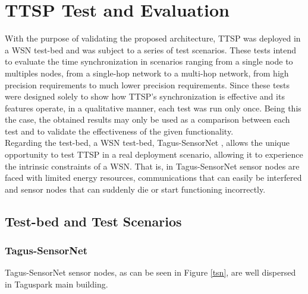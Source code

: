 \chapter{TTSP Test and Evaluation}

With the purpose of validating the proposed architecture, TTSP was deployed in a WSN test-bed and was subject to a series of test scenarios. These tests intend to evaluate the time synchronization in scenarios ranging from a single node to multiples nodes, from a single-hop network to a multi-hop network, from high precision requirements to much lower precision requirements. Since these tests were designed solely to show how TTSP's synchronization is effective and its features operate, in a qualitative manner, each test was run only once. Being this the case, the obtained results may only be used as a comparison between each test and to validate the effectiveness of the given functionality.\\
Regarding the test-bed, a WSN test-bed, Tagus-SensorNet \cite{conf/icccn/PedrosaMRN08}, allows the unique opportunity to test TTSP in a real deployment scenario, allowing it to experience the intrinsic constraints of a WSN. That is, in Tagus-SensorNet sensor nodes are faced with limited energy resources, communications that can easily be interfered and sensor nodes that can suddenly die or start functioning incorrectly.

\section{Test-bed and Test Scenarios}

\subsection{Tagus-SensorNet}
Tagus-SensorNet sensor nodes, as can be seen in Figure \ref{tsn}, are well dispersed in Taguspark main building.\\

